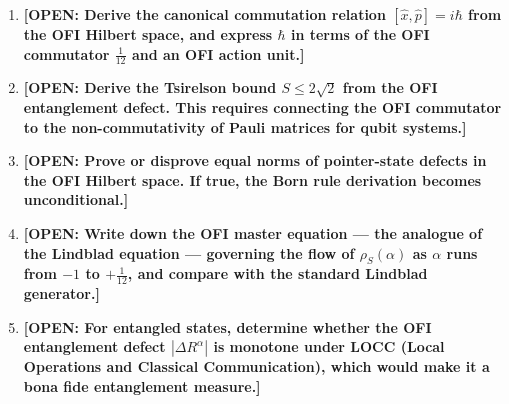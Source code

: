 \documentclass[12pt]{article}
\theoremstyle{definition}
\newcommand{\OPEN}[1]{\textcolor{opencolor}{\textbf{[OPEN: #1]}}}
\begin{document}
\begin{enumerate}[leftmargin=2em]
\item \OPEN{Derive the canonical commutation relation $[\hat{x},\hat{p}] = i\hbar$
  from the OFI Hilbert space, and express $\hbar$ in terms of the OFI
  commutator $\tfrac{1}{12}$ and an OFI action unit.}

\item \OPEN{Derive the Tsirelson bound $S \leq 2\sqrt{2}$ from the OFI
  entanglement defect.  This requires connecting the OFI commutator to
  the non-commutativity of Pauli matrices for qubit systems.}

\item \OPEN{Prove or disprove equal norms of pointer-state defects in the
  OFI Hilbert space.  If true, the Born rule derivation becomes unconditional.}

\item \OPEN{Write down the OFI master equation — the analogue of the Lindblad
  equation — governing the flow of $\rho_S(\alpha)$ as $\alpha$ runs from
  $-1$ to $+\tfrac{1}{12}$, and compare with the standard Lindblad
  generator.}

\item \OPEN{For entangled states, determine whether the OFI entanglement
  defect $|\Delta R^\alpha|$ is monotone under LOCC (Local Operations and
  Classical Communication), which would make it a bona fide entanglement
  measure.}
\end{enumerate}
\end{document}
